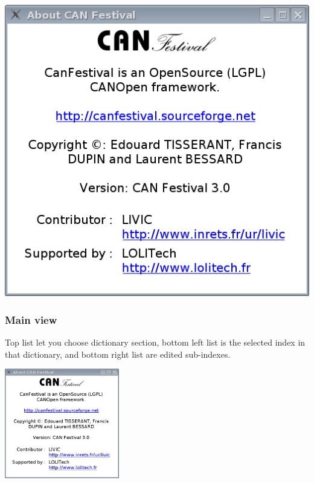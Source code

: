 \documentclass[12pt,twoside]{article}
\begin{document}
 \begin{center}
   \includegraphics[width=15cm]{Pictures/10000201000001FC000001E5D65E8766.png}
\end{center}

\subsubsection{Main view}
Top list let you choose dictionary section, bottom left list is the
selected index in that dictionary, and bottom right list are edited
sub{}-indexes.

 \begin{center}
   \includegraphics[width=5cm]{Pictures/10000201000001FC000001E5D65E8766.png}
\end{center}
\end{document}
